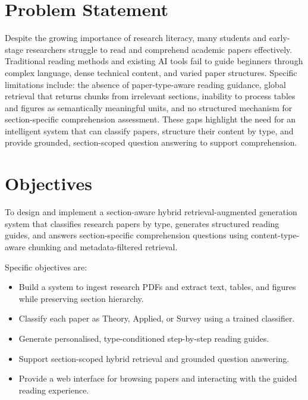 \documentclass[12pt,a4paper]{report}
\begin{document}
\section{Problem Statement}

Despite the growing importance of research literacy, many students and
early-stage researchers struggle to read and comprehend academic papers
effectively. Traditional reading methods and existing AI tools fail to guide
beginners through complex language, dense technical content, and varied paper
structures. Specific limitations include: the absence of paper-type-aware
reading guidance, global retrieval that returns chunks from irrelevant sections,
inability to process tables and figures as semantically meaningful units, and no
structured mechanism for section-specific comprehension assessment. These gaps
highlight the need for an intelligent system that can classify papers, structure
their content by type, and provide grounded, section-scoped question answering
to support comprehension.

\section{Objectives}

To design and implement a section-aware hybrid retrieval-augmented generation
system that classifies research papers by type, generates structured reading
guides, and answers section-specific comprehension questions using
content-type-aware chunking and metadata-filtered retrieval.

Specific objectives are:
\begin{itemize}
    \item Build a system to ingest research PDFs and extract text, tables, and
          figures while preserving section hierarchy.
    \item Classify each paper as Theory, Applied, or Survey using a trained
          classifier.
    \item Generate personalised, type-conditioned step-by-step reading guides.
    \item Support section-scoped hybrid retrieval and grounded question answering.
    \item Provide a web interface for browsing papers and interacting with the
          guided reading experience.
\end{itemize}
\end{document}
